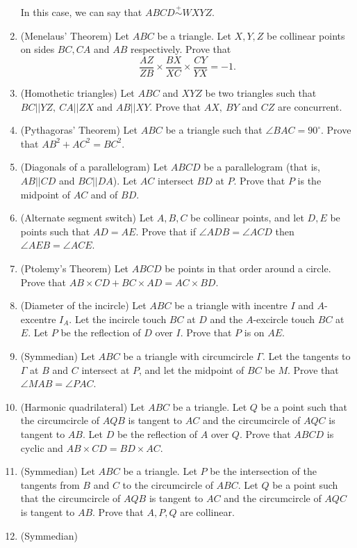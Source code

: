 \documentclass{article}
\begin{document}
\begin{enumerate}
    In this case, we can say that $ABCD\overset +\sim WXYZ$.
  \item (Menelaus' Theorem) 
    Let $ABC$ be a triangle. Let $X,Y,Z$ be collinear points on sides
    $BC,CA$ and $AB$
    respectively. Prove that \[\frac{AZ}{ZB}\times\frac{BX}{XC}\times\frac{CY}{YX}=-1.\]
  \item (Homothetic triangles)
    Let $ABC$ and $XYZ$ be two triangles such that $BC||YZ,\ CA||ZX$ and $AB||XY$.
    Prove that $AX,\ BY$ and $CZ$ are concurrent.
  \item (Pythagoras' Theorem) 
    Let $ABC$ be a triangle such that $\angle BAC=90^\circ$. Prove that
    $AB^2+AC^2=BC^2$. 
  \item (Diagonals of a parallelogram)
    Let $ABCD$ be a parallelogram (that is, $AB||CD$ and $BC||DA$). Let $AC$
    intersect $BD$ at $P$. Prove that $P$ is the midpoint of $AC$ and of $BD$.
  \item (Alternate segment switch) 
    Let $A,B,C$ be collinear points, and let $D,E$ be points such that $AD=AE$.
    Prove that if $\angle ADB=\angle ACD$ then $\angle AEB=\angle ACE$. 
  \item (Ptolemy's Theorem) 
    Let $ABCD$ be points in that order around a circle. Prove that $AB\times
    CD+BC\times AD=AC\times BD$. 
  \item (Diameter of the incircle)
    Let $ABC$ be a triangle with incentre $I$ and $A$-excentre $I_A$. Let the
    incircle touch $BC$ at $D$ and the $A$-excircle touch $BC$ at $E$. Let $P$
    be the reflection of $D$ over $I$. Prove that $P$ is on $AE$. 
  \item (Symmedian)
    Let $ABC$ be a triangle with circumcircle $\Gamma$. Let the tangents to
    $\Gamma$ at $B$ and $C$ intersect at $P$, and let the midpoint of $BC$ be
    $M$. Prove that $\angle MAB=\angle PAC$.
  \item (Harmonic quadrilateral)
    Let $ABC$ be a triangle. Let $Q$ be a point such that the circumcircle of
    $AQB$ is tangent to $AC$ and the circumcircle of $AQC$ is tangent to $AB$.
    Let $D$ be the reflection of $A$ over $Q$. Prove that $ABCD$ is cyclic and
    $AB\times CD=BD\times AC$. 
  \item (Symmedian)
    Let $ABC$ be a triangle. Let $P$ be the intersection of the tangents from
    $B$ and $C$ to the circumcircle of $ABC$. 
    Let $Q$ be a point such that the circumcircle of
    $AQB$ is tangent to $AC$ and the circumcircle of $AQC$ is tangent to $AB$.
    Prove that $A, P, Q$ are collinear. 
  \item (Symmedian)

\end{enumerate}
\end{document}
